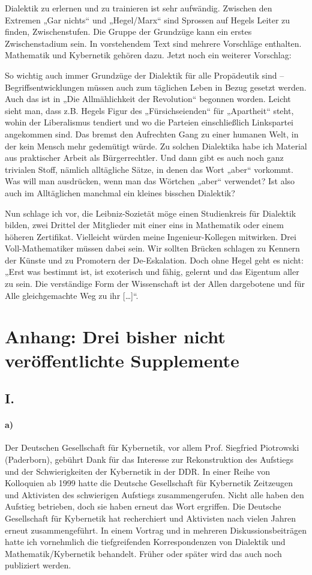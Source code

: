 \documentclass[11pt,a4paper]{article}
\begin{document}
Dialektik zu erlernen und zu trainieren ist sehr aufwändig. Zwischen den
Extremen „Gar nichts“ und „Hegel/Marx“ sind Sprossen auf Hegels Leiter zu
finden, Zwischenstufen. Die Gruppe der Grundzüge kann ein erstes
Zwischenstadium sein. In vorstehendem Text sind mehrere Vorschläge enthalten.
Mathematik und Kybernetik gehören dazu. Jetzt noch ein weiterer Vorschlag:

So wichtig auch immer Grundzüge der Dialektik für alle Propädeutik sind –
Begriffsentwicklungen müssen auch zum täglichen Leben in Bezug gesetzt werden.
Auch das ist in „Die Allmählichkeit der Revolution“ begonnen worden. Leicht
sieht man, dass z.B. Hegels Figur des „Fürsichseienden“ für „Apartheit“ steht,
wohin der Liberalismus tendiert und wo die Parteien einschließlich Linkspartei
angekommen sind. Das bremst den Aufrechten Gang zu einer humanen Welt, in der
kein Mensch mehr gedemütigt würde. Zu solchen Dialektika habe ich Material aus
praktischer Arbeit als Bürgerrechtler. Und dann gibt es auch noch ganz
trivialen Stoff, nämlich alltägliche Sätze, in denen das Wort „aber“ vorkommt.
Was will man ausdrücken, wenn man das Wörtchen „aber“ verwendet? Ist also auch
im Alltäglichen manchmal ein kleines bisschen Dialektik?

Nun schlage ich vor, die Leibniz-Sozietät möge einen Studienkreis für
Dialektik bilden, zwei Drittel der Mitglieder mit einer eins in Mathematik
oder einem höheren Zertifikat. Vielleicht würden meine Ingenieur-Kollegen
mitwirken. Drei Voll-Mathematiker müssen dabei sein. Wir sollten Brücken
schlagen zu Kennern der Künste und zu Promotern der De-Eskalation. Doch ohne
Hegel geht es nicht: „Erst was bestimmt ist, ist exoterisch und fähig, gelernt
und das Eigentum aller zu sein. Die verständige Form der Wissenschaft ist der
Allen dargebotene und für Alle gleichgemachte Weg zu ihr [\ldots]“.

\section{Anhang: Drei bisher nicht veröffentlichte Supplemente}

\subsection*{I.}

\paragraph{a)}
Der Deutschen Gesellschaft für Kybernetik, vor allem Prof. Siegfried
Piotrowski (Paderborn), gebührt Dank für das Interesse zur Rekonstruktion des
Aufstiegs und der Schwierigkeiten der Kybernetik in der DDR. In einer Reihe
von Kolloquien ab 1999 hatte die Deutsche Gesellschaft für Kybernetik
Zeitzeugen und Aktivisten des schwierigen Aufstiegs zusammengerufen. Nicht
alle haben den Aufstieg betrieben, doch sie haben erneut das Wort ergriffen.
Die Deutsche Gesellschaft für Kybernetik hat recherchiert und Aktivisten nach
vielen Jahren erneut zusammengeführt. In einem Vortrag und in mehreren
Diskussionsbeiträgen hatte ich vornehmlich die tiefgreifenden Korrespondenzen
von Dialektik und Mathematik/Kybernetik behandelt. Früher oder später wird das
auch noch publiziert werden.
\end{document}
